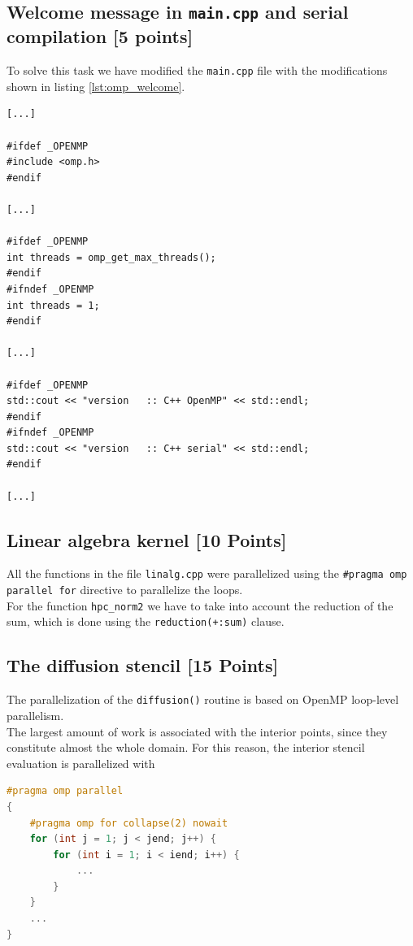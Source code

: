 \documentclass[unicode,10pt,a4paper,oneside,numbers=endperiod,openany]{scrartcl}
\begin{document}
\subsection{Welcome message in \texttt{main.cpp} and serial compilation [5 points]}
To solve this task we have modified the \texttt{main.cpp} file with the modifications shown in listing \ref{lst:omp_welcome}.
\begin{lstlisting}[style=grayverbatim, label={lst:omp_welcome}, caption={Modifications to the welcome message in \texttt{main.cpp} to support OpenMP}]
[...]

#ifdef _OPENMP
#include <omp.h>
#endif

[...]

#ifdef _OPENMP
int threads = omp_get_max_threads(); 
#endif
#ifndef _OPENMP
int threads = 1;
#endif

[...]

#ifdef _OPENMP
std::cout << "version   :: C++ OpenMP" << std::endl;
#endif
#ifndef _OPENMP
std::cout << "version   :: C++ serial" << std::endl;
#endif

[...]
\end{lstlisting}
\subsection{Linear algebra kernel [10 Points]}
All the functions in the file \texttt{linalg.cpp} were parallelized using the \texttt{\#pragma omp parallel for} directive to parallelize the loops.\\
For the function \texttt{hpc\_norm2} we have to take into account the reduction of the sum, which is done using the \texttt{reduction(+:sum)} clause.\\
\subsection{The diffusion stencil [15 Points]}
The parallelization of the \texttt{diffusion()} routine is based on OpenMP loop-level parallelism.\\  
The largest amount of work is associated with the interior points, since they constitute almost the whole domain.  
For this reason, the interior stencil evaluation is parallelized with
\begin{lstlisting}[language=C++,style=grayverbatim]
#pragma omp parallel
{
    #pragma omp for collapse(2) nowait
    for (int j = 1; j < jend; j++) {
        for (int i = 1; i < iend; i++) {
            ...
        }
    }
    ...
}
\end{lstlisting}
\end{document}
